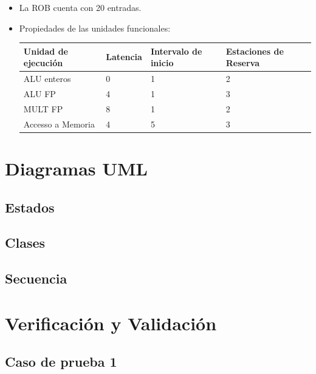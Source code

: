 \documentclass[a4paper]{article}
\begin{document}
	  \begin{itemize}
		\item La ROB cuenta con 20 entradas.
		\item Propiedades de las unidades funcionales:
		\begin{table}[]
			\centering
			\begin{tabular}{|l|l|l|l|}
				\hline
				\textbf{Unidad de ejecución} & \textbf{Latencia} & \textbf{Intervalo de inicio} & \textbf{Estaciones de Reserva} \\ \hline
				ALU enteros                  & 0                 & 1                            & 2                              \\ \hline
				ALU FP                       & 4                 & 1                            & 3                              \\ \hline
				MULT FP                      & 8                 & 1                            & 2                              \\ \hline
				Accesso a Memoria                      & 4                 & 5                            & 3                              \\ \hline
			\end{tabular}
		\end{table}
	\end{itemize}
		
	\section{Diagramas UML}

	\subsection*{Estados}
	\subsection*{Clases}
	\subsection*{Secuencia}
	
	\section{Verificación y Validación}

	\subsection*{Caso de prueba 1}
\end{document}
